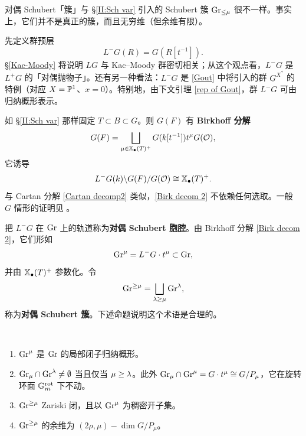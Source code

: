 对偶 Schubert「簇」与 \S\ref{II:Sch var} 引入的 Schubert 簇 ${\operatorname{Gr}}_{\leq \mu}$ 很不一样。事实上，它们并不是真正的簇，而且无穷维（但余维有限）。

先定义群预层
\[L^-G(R)=G(R[t^{-1}]).\]
\S\ref{Kac-Moody} 将说明 $LG$ 与 Kac--Moody 群密切相关；从这个观点看，$L^-G$ 是 $L^+G$ 的「对偶抛物子」。还有另一种看法：$L^-G$ 是 \eqref{Gout} 中将引入的群 $\underline G^{X^*}$ 的特例（对应 $X={\mathbb P}^1$、$x=0$）。特别地，由下文引理 \ref{rep of Gout}，群 $L^-G$ 可由归纳概形表示。

如 \S\ref{II:Sch var} 那样固定 $T\subset B\subset G$。则 $G(F)$ 有 \textbf{Birkhoff 分解}
\begin{equation}\label{Birk decom}
G(F)=\bigsqcup_{\mu\in \mathbb{X}_\bullet(T)^+} G(k[t^{-1}])t^\mu G({\mathcal O}),
\end{equation}
它诱导
\begin{equation}\label{Birk decom 2}
L^-G(k)\backslash G(F)/G({\mathcal O})\cong \mathbb{X}_\bullet(T)^+.
\end{equation}
与 Cartan 分解 \eqref{Cartan decomp2} 类似，\eqref{Birk decom 2} 不依赖任何选取。一般 $G$ 情形的证明见 \cite[Lemma 4]{Fa}。

把 $L^-G$ 在 ${\operatorname{Gr}}$ 上的轨道称为\textbf{对偶 Schubert 胞腔}。由 Birkhoff 分解 \eqref{Birk decom 2}，它们形如
\[{\operatorname{Gr}}^\mu=L^-G\cdot t^\mu \subset {\operatorname{Gr}},\]
并由 $\mathbb{X}_\bullet(T)^+$ 参数化。令
\[{\operatorname{Gr}}^{\geq \mu}=\bigsqcup_{{\lambda}\geq \mu}{\operatorname{Gr}}^{\lambda},\]
称为\textbf{对偶 Schubert 簇}。下述命题说明这个术语是合理的。

\begin{prop}\label{geom of opp Sch}~
\begin{enumerate}
\item ${\operatorname{Gr}}^\mu$ 是 ${\operatorname{Gr}}$ 的局部闭子归纳概形。

\item ${\operatorname{Gr}}_\mu\cap {\operatorname{Gr}}^{\lambda}\neq \emptyset$ 当且仅当 $\mu\geq {\lambda}$。此外 ${\operatorname{Gr}}_\mu\cap {\operatorname{Gr}}^\mu= G\cdot t^\mu\cong G/P_\mu$，它在旋转环面 ${\mathbb G}_m^{\operatorname{rot}}$ 下不动。

\item ${\operatorname{Gr}}^{\geq \mu}$ Zariski 闭，且以 ${\operatorname{Gr}}^\mu$ 为稠密开子集。

\item ${\operatorname{Gr}}^{\geq \mu}$ 的余维为 $(2\rho,\mu)-\dim G/P_\mu$。
\end{enumerate}
\end{prop}

